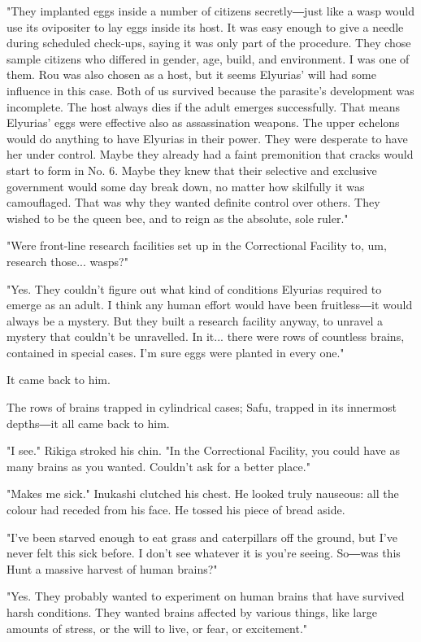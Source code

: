 "They implanted eggs inside a number of citizens secretly―just like a
wasp would use its ovipositer to lay eggs inside its host. It was easy
enough to give a needle during scheduled check-ups, saying it was only
part of the procedure. They chose sample citizens who differed in
gender, age, build, and environment. I was one of them. Rou was also
chosen as a host, but it seems Elyurias' will had some influence in this
case. Both of us survived because the parasite's development was
incomplete. The host always dies if the adult emerges successfully. That
means Elyurias' eggs were effective also as assassination weapons. The
upper echelons would do anything to have Elyurias in their power. They
were desperate to have her under control. Maybe they already had a faint
premonition that cracks would start to form in No. 6. Maybe they knew
that their selective and exclusive government would some day break down,
no matter how skilfully it was camouflaged. That was why they wanted
definite control over others. They wished to be the queen bee, and to
reign as the absolute, sole ruler."

"Were front-line research facilities set up in the Correctional Facility
to, um, research those... wasps?"

"Yes. They couldn't figure out what kind of conditions Elyurias required
to emerge as an adult. I think any human effort would have been
fruitless―it would always be a mystery. But they built a research
facility anyway, to unravel a mystery that couldn't be unravelled. In
it... there were rows of countless brains, contained in special cases.
I'm sure eggs were planted in every one."

It came back to him.

The rows of brains trapped in cylindrical cases; Safu, trapped in its
innermost depths―it all came back to him.

"I see." Rikiga stroked his chin. "In the Correctional Facility, you
could have as many brains as you wanted. Couldn't ask for a better
place."

"Makes me sick." Inukashi clutched his chest. He looked truly nauseous:
all the colour had receded from his face. He tossed his piece of bread
aside.

"I've been starved enough to eat grass and caterpillars off the ground,
but I've never felt this sick before. I don't see whatever it is you're
seeing. So―was this Hunt a massive harvest of human brains?"

"Yes. They probably wanted to experiment on human brains that have
survived harsh conditions. They wanted brains affected by various
things, like large amounts of stress, or the will to live, or fear, or
excitement."


